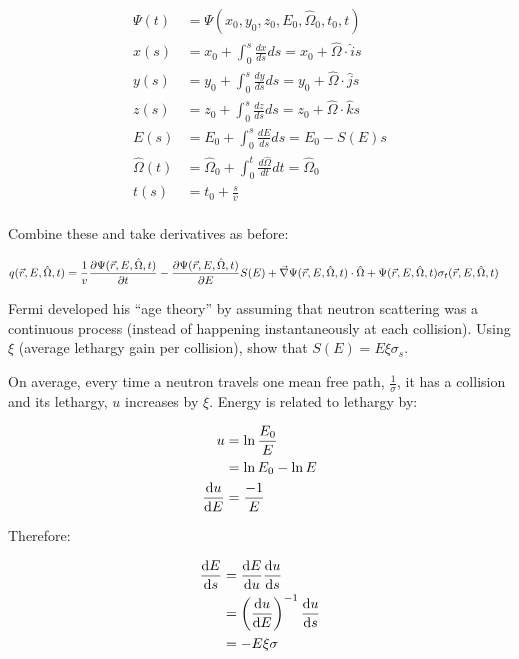 \documentclass{hw}
\begin{document}
\solution
	\begin{align*}
	    \Psi (t) &= \Psi(x_0, y_0, z_0, E_0, \hat{\Omega}_0, t_0, t) \\
    	x(s) &= x_0 + \int_0^s \frac{dx}{ds} ds = x_0 + \hat{\Omega} \cdot \hat{i} s \\
    	y(s) &= y_0 + \int_0^s \frac{dy}{ds} ds = y_0 + \hat{\Omega} \cdot \hat{j} s \\
    	z(s) &= z_0 + \int_0^s \frac{dz}{ds} ds = z_0 + \hat{\Omega} \cdot \hat{k} s \\
    	E(s) &= E_0 + \int_0^s \frac{dE}{ds} ds = E_0 - S(E) s \\
    	\hat{\Omega}(t) &= \hat{\Omega}_0 + \int_0^t \frac{d\hat{\Omega}}{dt} dt = \hat{\Omega}_0 \\
    	t(s) &= t_0 + \frac{s}{v} \\
    \end{align*}

    Combine these and take derivatives as before:
    
    \begin{align*}
    	q(\vec{r}, E, \hat{\Omega}, t) &= \frac{1}{v} \pdv{\Psi(\vec{r}, E, \hat{\Omega}, t)}{t} - \pdv{\Psi(\vec{r}, E, \hat{\Omega}, t)}{E} S(E) + \vec{\nabla} \Psi(\vec{r}, E, \hat{\Omega}, t) \cdot \hat{\Omega} + \Psi(\vec{r}, E, \hat{\Omega}, t) \sigma_t(\vec{r}, E, \hat{\Omega}, t)
    \end{align*}
    

\problem{}
    Fermi developed his “age theory” by assuming that neutron scattering was a continuous process (instead of happening instantaneously at each collision). Using $\xi$ (average lethargy gain per collision), show that $S(E)=E \xi \sigma_s$.

\solution
    On average, every time a neutron travels one mean free path, $\frac{1}{\sigma}$, it has a collision and its lethargy, $u$ increases by $\xi$. Energy is related to lethargy by:

    \begin{align*}
    	u &= \ln{\frac{E_0}{E}} \\
    	&= \ln{E_0} - \ln{E} \\
    	\dv{u}{E} &= \frac{-1}{E}
    \end{align*}

    Therefore:

    \begin{align*}
    	\dv{E}{s} &= \dv{E}{u} \dv{u}{s} \\
    	&= \left( \dv{u}{E} \right)^{-1} \dv{u}{s} \\
    	&= -E \xi \sigma
    \end{align*}
\end{document}
